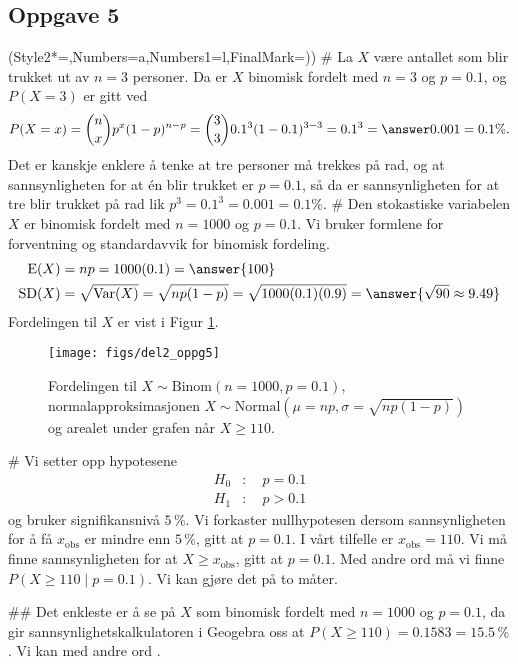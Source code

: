 \subsection*{Oppgave 5}
\begin{easylist}[enumerate]
	\ListProperties(Style2*=,Numbers=a,Numbers1=l,FinalMark={)})
	# La $X$ være antallet som blir trukket ut av $n = 3$ personer.
	Da er $X$ binomisk fordelt med $n=3$ og $p = 0.1$, og $P(X = 3)$ er gitt ved
	\begin{equation*}
		P(X = x) = \binom{n}{x} p^x (1-p)^{n-p} = 
		\binom{3}{3} 0.1^3 (1-0.1)^{3 -3} = 0.1^3 = \answer{0.001 = 0.1 \%}.
	\end{equation*}
	Det er kanskje enklere å tenke at tre personer må trekkes på rad, og at sannsynligheten for at én blir trukket er $p = 0.1$, så da er sannsynligheten for at tre blir trukket på rad lik $p^3 = 0.1^3 = 0.001 = 0.1 \%$.
	# Den stokastiske variabelen $X$ er binomisk fordelt med $n=1000$ og $p = 0.1$. Vi bruker formlene for forventning og standardavvik for binomisk fordeling.
	\begin{align*}
		\operatorname{E}(X) &= np = 1000 (0.1) = \answer{100}\\
		\operatorname{SD}(X) &= \sqrt{\operatorname{Var}(X)} 
		= \sqrt{np(1-p)} = \sqrt{1000 (0.1) (0.9)} = \answer{\sqrt{90} \approx 9.49}
	\end{align*}
	Fordelingen til $X$ er vist i Figur \ref{fig:del2_oppg5}.
	
\begin{figure}[ht!]
\centering
\texttt{[image: figs/del2\_oppg5]}
\caption{Fordelingen til $X \sim \text{Binom}(n =1000, p=0.1)$, normalapproksimasjonen $X \sim \text{Normal} \left(  \mu = np, \sigma = \sqrt{np(1-p)}\right)$
	og arealet under grafen når $X\geq 110$.}
\label{fig:del2_oppg5}
\end{figure}

	# Vi setter opp hypotesene
	\begin{align*}
		H_0 &: \quad p = 0.1\\ 
		H_1 &: \quad p > 0.1
	\end{align*}
	og bruker signifikansnivå $5 \, \%$. 
	Vi forkaster nullhypotesen dersom sannsynligheten for å få
	$x_\text{obs}$ er  mindre enn $5 \, \%$, gitt at $p = 0.1$.
	I vårt tilfelle er $x_\text{obs} = 110$.
	Vi må finne sannsynligheten for at $X \geq x_\text{obs}$,
	gitt at $p = 0.1$.
	Med andre ord må vi finne $P(X \geq 110 \mid p = 0.1)$.
	Vi kan gjøre det på to måter.
	
	## Det enkleste er å se på $X$ som binomisk fordelt med
	$n = 1000$ og $p = 0.1$, da gir sannsynlighetskalkulatoren
	i Geogebra oss at $P(X \geq 110) = 0.1583 = 15.5 \, \%$.
	Vi kan med andre ord .
	

\end{easylist}
